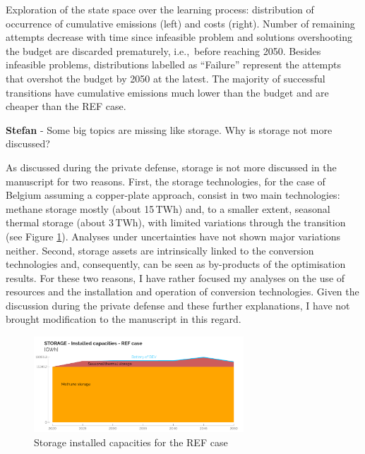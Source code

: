 \documentclass[12pt,a4paper]{article}
\def\ie{i.e.,\ }
\begin{document}
\begin{mdframed}[style=manuscript] %
Exploration of the state space over the learning process: distribution of occurrence of cumulative emissions (left) and costs (right). Number of remaining attempts decrease with time since infeasible problem and solutions overshooting the  budget are discarded prematurely, \ie before reaching 2050. Besides infeasible problems, distributions labelled as ``Failure'' represent the attempts that overshot the  budget by 2050 at the latest. The majority of successful transitions have cumulative emissions much lower than the  budget and are cheaper than the REF case. 
\end{mdframed}

\begin{mdframed}[style=comment] %
{\color{teal} \textbf{Stefan}} - Some big topics are missing like storage. Why is storage not more discussed? 
\end{mdframed}

\noindent As discussed during the private defense, storage is not more discussed in the manuscript for two reasons. First, the storage technologies, for the case of Belgium assuming a copper-plate approach, consist in two main technologies: methane storage mostly (about 15\,TWh) and, to a smaller extent, seasonal thermal storage (about 3\,TWh), with limited variations through the transition (see Figure \ref{fig:STORAGE_2}). Analyses under uncertainties have not shown major variations neither. Second, storage assets are intrinsically linked to the conversion technologies and, consequently, can be seen as by-products of the optimisation results. For these two reasons, I have rather focused my analyses on the use of resources and the installation and operation of conversion technologies. Given the discussion during the private defense and these further explanations, I have not brought modification to the manuscript in this regard.

\begin{figure}[htbp!]
\centering
\includegraphics[width=0.7\textwidth]{STORAGE_2.pdf}
\caption{Storage installed capacities for the REF case}
\label{fig:STORAGE_2}
\end{figure}
\end{document}

